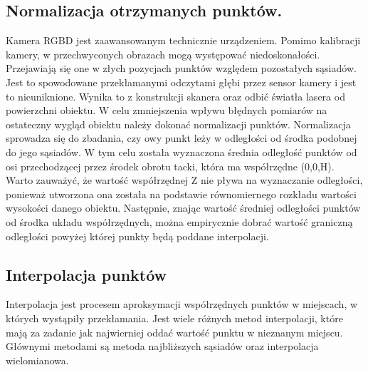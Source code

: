 \subsection{Normalizacja otrzymanych punktów.}
Kamera RGBD jest zaawansowanym technicznie urządzeniem. Pomimo kalibracji kamery, w przechwyconych obrazach mogą występować niedoskonałości. Przejawiają się one w złych pozycjach punktów względem pozostałych sąsiadów. Jest to spowodowane przekłamanymi odczytami głębi przez sensor kamery i jest to nieuniknione. Wynika to z konstrukcji skanera oraz odbić światła lasera od powierzchni obiektu. W celu zmniejszenia wpływu błędnych pomiarów na ostateczny wygląd obiektu należy dokonać normalizacji punktów. Normalizacja sprowadza się do zbadania, czy owy punkt leży w odległości od środka podobnej do jego sąsiadów. W tym celu została wyznaczona średnia odległość punktów od osi przechodzącej przez środek obrotu tacki, która ma współrzędne (0,0,H). Warto zauważyć, że wartość współrzędnej Z nie pływa na wyznaczanie odległości, ponieważ utworzona ona została na podstawie równomiernego rozkładu wartości wysokości danego obiektu. Następnie, znając wartość średniej odległości punktów od środka układu współrzędnych, można empirycznie dobrać wartość graniczną odległości powyżej której punkty będą poddane interpolacji.

\subsection{Interpolacja punktów}
Interpolacja jest procesem aproksymacji współrzędnych punktów w miejscach, w których wystąpiły przekłamania. Jest wiele różnych metod interpolacji, które mają za zadanie jak najwierniej oddać wartość punktu w nieznanym miejscu. Głównymi metodami są metoda najbliższych sąsiadów oraz interpolacja wielomianowa.

